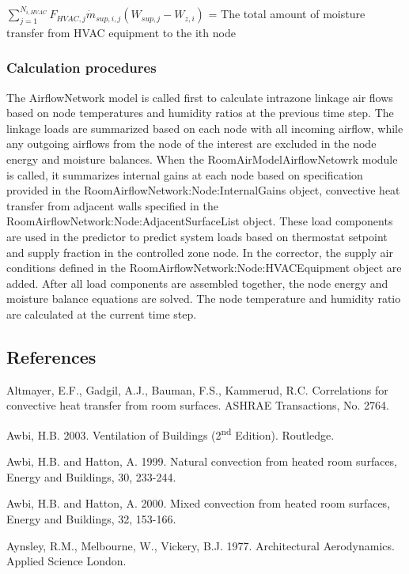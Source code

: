 \({\sum\limits_{j = 1}^{N_{i,HVAC}} F_{HVAC,j} \dot m_{sup,i,j} \left( W_{sup,j} - W_{z,i}\right)}\) = The total amount of moisture transfer from HVAC equipment to the ith node

\subsubsection{Calculation procedures}\label{calculation-procedures}

The AirflowNetwork model is called first to calculate intrazone linkage air flows based on node temperatures and humidity ratios at the previous time step. The linkage loads are summarized based on each node with all incoming airflow, while any outgoing airflows from the node of the interest are excluded in the node energy and moisture balances. When the RoomAirModelAirflowNetowrk module is called, it summarizes internal gains at each node based on specification provided in the RoomAirflowNetwork:Node:InternalGains object, convective heat transfer from adjacent walls specified in the RoomAirflowNetwork:Node:AdjacentSurfaceList object. These load components are used in the predictor to predict system loads based on thermostat setpoint and supply fraction in the controlled zone node. In the corrector, the supply air conditions defined in the RoomAirflowNetwork:Node:HVACEquipment object are added. After all load components are assembled together, the node energy and moisture balance equations are solved. The node temperature and humidity ratio are calculated at the current time step.

\subsection{References}\label{ra-references}

Altmayer, E.F., Gadgil, A.J., Bauman, F.S., Kammerud, R.C. Correlations for convective heat transfer from room surfaces. ASHRAE Transactions, No. 2764.

Awbi, H.B. 2003. Ventilation of Buildings (2\textsuperscript{nd} Edition). Routledge.

Awbi, H.B. and Hatton, A. 1999. Natural convection from heated room surfaces, Energy and Buildings, 30, 233-244.

Awbi, H.B. and Hatton, A. 2000. Mixed convection from heated room surfaces, Energy and Buildings, 32, 153-166.

Aynsley, R.M., Melbourne, W., Vickery, B.J. 1977. Architectural Aerodynamics. Applied Science London.


